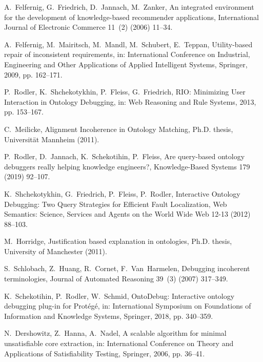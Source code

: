 \documentclass[]{elsarticle}
\begin{document}
\begin{thebibliography}{10}
		A.~Felfernig, G.~Friedrich, D.~Jannach, M.~Zanker, An integrated environment
		for the development of knowledge-based recommender applications,
		International Journal of Electronic Commerce 11~(2) (2006) 11--34.
		
		A.~Felfernig, M.~Mairitsch, M.~Mandl, M.~Schubert, E.~Teppan, Utility-based
		repair of inconsistent requirements, in: International Conference on
		Industrial, Engineering and Other Applications of Applied Intelligent
		Systems, Springer, 2009, pp. 162--171.
		
		P.~Rodler, K.~Shchekotykhin, P.~Fleiss, G.~Friedrich, {RIO: Minimizing User
			Interaction in Ontology Debugging}, in: Web Reasoning and Rule Systems, 2013,
		pp. 153--167.
		
		C.~Meilicke, {Alignment Incoherence in Ontology Matching}, Ph.D. thesis,
		Universit\"at Mannheim (2011).
		
		P.~Rodler, D.~Jannach, K.~Schekotihin, P.~Fleiss, Are query-based ontology
		debuggers really helping knowledge engineers?, Knowledge-Based Systems 179
		(2019) 92--107.
		
		K.~Shchekotykhin, G.~Friedrich, P.~Fleiss, P.~Rodler, {Interactive Ontology
			Debugging: Two Query Strategies for Efficient Fault Localization}, Web
		Semantics: Science, Services and Agents on the World Wide Web 12-13 (2012)
		88--103.
		
		M.~Horridge, Justification based explanation in ontologies, Ph.D. thesis,
		University of Manchester (2011).
		
		S.~Schlobach, Z.~Huang, R.~Cornet, F.~Van~Harmelen, Debugging incoherent
		terminologies, Journal of Automated Reasoning 39~(3) (2007) 317--349.
		
		K.~Schekotihin, P.~Rodler, W.~Schmid, {OntoDebug: Interactive ontology debugging
			plug-in for Prot{\'e}g{\'e}}, in: International Symposium on Foundations of
		Information and Knowledge Systems, Springer, 2018, pp. 340--359.
		
		N.~Dershowitz, Z.~Hanna, A.~Nadel, A scalable algorithm for minimal
		unsatisfiable core extraction, in: International Conference on Theory and
		Applications of Satisfiability Testing, Springer, 2006, pp. 36--41.
		

\end{thebibliography}
\end{document}
